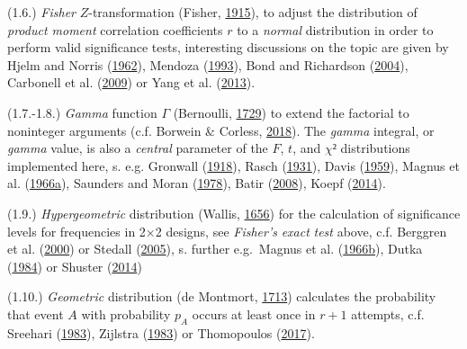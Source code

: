 \documentclass[
]{article}
\begin{document}
(1.6.) \emph{Fisher} \(Z\)-transformation (Fisher,
\href{https://doi.org/10.2307/2331838}{1915}), to adjust the
distribution of \emph{product moment} correlation coefficients \(r\) to
a \emph{normal} distribution in order to perform valid significance
tests, interesting discussions on the topic are given by Hjelm and
Norris (\href{http://www.jstor.org/stable/20156574}{1962}), Mendoza
(\href{https://doi.org/10.1007/BF02294830}{1993}), Bond and Richardson
(\href{https://doi.org/10.1007/BF02295945}{2004}), Carbonell et al.
(\href{https://doi.org/10.1016/j.spl.2008.11.007}{2009}) or Yang et al.
(\href{https://doi.org/10.1007/s12209-013-1978-8}{2013}).

(1.7.-1.8.) \emph{Gamma} function \(\Gamma\) (Bernoulli,
\href{https://commons.m.wikimedia.org/wiki/File:DanielBernoulliLetterToGoldbach-1729-10-06.jpg}{1729})
to extend the factorial to noninteger arguments (c.f. Borwein \&
Corless, \href{https://www.jstor.org/stable/48663320}{2018}). The
\emph{gamma} integral, or \emph{gamma} value, is also a \emph{central}
parameter of the \(F\), \(t\), and \(\chi ²\) distributions implemented
here, s. e.g. Gronwall
(\href{http://www.jstor.org/stable/1967180}{1918}), Rasch
(\href{http://www.jstor.org/stable/1968254}{1931}), Davis
(\href{http://www.jstor.org/stable/2309786}{1959}), Magnus et al.
(\href{https://doi.org/10.1007/978-3-662-11761-3_1}{1966a}), Saunders
and Moran (\href{https://doi.org/10.2307/3213414}{1978}), Batir
(\href{https://doi.org/10.1016/j.exmath.2007.10.001}{2008}), Koepf
(\href{https://doi.org/10.1007/978-1-4471-6464-7_1}{2014}).

(1.9.) \emph{Hypergeometric} distribution (Wallis,
\href{https://books.google.com/books?id=Z5w_AAAAcAAJ}{1656}) for the
calculation of significance levels for frequencies in 2×2 designs, see
\emph{Fisher's} \emph{exact} \emph{test} above, c.f. Berggren et al.
(\href{https://doi.org/10.1007/978-1-4757-3240-5_11}{2000}) or Stedall
(\href{https://doi.org/10.1016/B978-044450871-3/50083-8}{2005}), s.
further e.g.~Magnus et al.
(\href{https://doi.org/10.1007/978-3-662-11761-3_2}{1966b}), Dutka
(\href{http://www.jstor.org/stable/41133728}{1984}) or Shuster
(\href{https://doi.org/10.1002/9781118445112.stat04869}{2014})

(1.10.) \emph{Geometric} distribution (de Montmort,
\href{https://books.google.com/books?id=PII_AAAAcAAJ}{1713}) calculates
the probability that event \(A\) with probability \(p_{A}\) occurs at
least once in \(r + 1\) attempts, c.f. Sreehari
(\href{http://www.jstor.org/stable/3213738}{1983}), Zijlstra
(\href{https://doi.org/10.2307/3213595}{1983}) or Thomopoulos
(\href{https://doi.org/10.1007/978-3-319-65112-5_15}{2017}).
\end{document}

